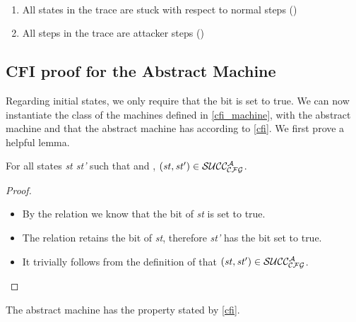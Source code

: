 \begin{definition}
\label{abstract_stopping}
~
\begin{enumerate}
\item All states in the trace are stuck with respect to normal steps
  (\stepn{}{})
\item All steps in the trace are attacker steps (\stepa{}{}{})
\end{enumerate}
\end{definition}

\subsection{CFI proof for the Abstract Machine}\label{abstract_proof}

Regarding initial states, we only require that the \ok bit is set to true.
We can now instantiate the class of the machines defined in 
\cref{cfi_machine}, with the abstract machine and that the abstract machine
has \CFI according to \cref{cfi}.
We first prove a helpful lemma.

\begin{lemma}
\label{attacker_no_v}
For all states \textit{st st'} such that 
and , $(\mathit{st},\mathit{st'}) \in \mathcal{SUCC_\mathcal{CFG}^{A}}$.
\end{lemma}

\begin{proof}
~
\begin{itemize}
\item By the relation  we know that the \ok bit
of \textit{st} is set to true. 
\item The relation  retains the \ok bit of
\textit{st}, therefore \textit{st'} has the \ok bit set to true.
\item It trivially follows from the definition of  that
$(\mathit{st},\mathit{st'}) \in \mathcal{SUCC_\mathcal{CFG}^{A}}$.
\end{itemize}
\end{proof}

\begin{theorem}\label{CFIabstract}
The abstract machine has the \CFI property stated by \cref{cfi}.
\end{theorem}

